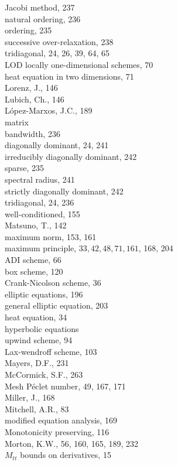 \documentclass[10pt]{article}
\begin{document}
Jacobi method, 237\\
natural ordering, 236\\
ordering, 235\\
successive over-relaxation, 238\\
tridiagonal, 24, 26, 39, 64, 65\\
LOD locally one-dimensional schemes, 70\\
heat equation in two dimensions, 71\\
Lorenz, J., 146\\
Lubich, Ch., 146\\
López-Marxos, J.C., 189\\
matrix\\
bandwidth, 236\\
diagonally dominant, 24, 241\\
irreducibly diagonally dominant, 242\\
sparse, 235\\
spectral radius, 241\\
strictly diagonally dominant, 242\\
tridiagonal, 24, 236\\
well-conditioned, 155\\
Matsuno, T., 142\\
maximum norm, 153, 161\\
maximum principle, \(33,42,48,71,161\), 168, 204\\
ADI scheme, 66\\
box scheme, 120\\
Crank-Nicolson scheme, 36\\
elliptic equations, 196\\
general elliptic equation, 203\\
heat equation, 34\\
hyperbolic equations\\
upwind scheme, 94\\
Lax-wendroff scheme, 103\\
Mayers, D.F., 231\\
McCormick, S.F., 263\\
Mesh Péclet number, 49, 167, 171\\
Miller, J., 168\\
Mitchell, A.R., 83\\
modified equation analysis, 169\\
Monotonicity preserving, 116\\
Morton, K.W., 56, 160, 165, 189, 232\\
\(M_{t t}\) bounds on derivatives, 15\\
\end{document}
